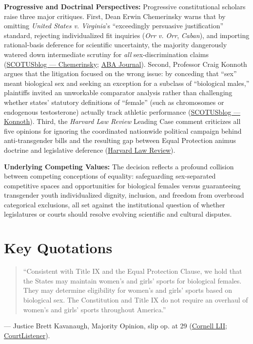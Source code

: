 \documentclass[12pt]{article}
\begin{document}
\textbf{Progressive and Doctrinal Perspectives:} Progressive constitutional scholars raise three major critiques. First, Dean Erwin Chemerinsky warns that by omitting \textit{United States v. Virginia}'s ``exceedingly persuasive justification'' standard, rejecting individualized fit inquiries (\textit{Orr v. Orr}, \textit{Caban}), and importing rational-basis deference for scientific uncertainty, the majority dangerously watered down intermediate scrutiny for \emph{all} sex-discrimination claims (\href{https://www.scotusblog.com/2026/08/weakening-the-protection-against-sex-discrimination/}{SCOTUSblog --- Chemerinsky}; \href{https://www.abajournal.com/columns/article/chemerinsky-how-supreme-courts-decisions-had-an-impact-on-democracy}{ABA Journal}). Second, Professor Craig Konnoth argues that the litigation focused on the wrong issue: by conceding that ``sex'' meant biological sex and seeking an exception for a subclass of ``biological males,'' plaintiffs invited an unworkable comparator analysis rather than challenging whether states' statutory definitions of ``female'' (such as chromosomes or endogenous testosterone) actually track athletic performance (\href{https://www.scotusblog.com/2026/07/why-the-supreme-court-decided-the-wrong-issue-in-the-transgender-athletes-cases/}{SCOTUSblog --- Konnoth}). Third, the \textit{Harvard Law Review} Leading Case comment criticizes all five opinions for ignoring the coordinated nationwide political campaign behind anti-transgender bills and the resulting gap between Equal Protection animus doctrine and legislative deference (\href{https://harvardlawreview.org/print/vol-140/west-virginia-v-b-p-j-ex-rel-jackson/}{Harvard Law Review}).

\textbf{Underlying Competing Values:} The decision reflects a profound collision between competing conceptions of equality: safeguarding sex-separated competitive spaces and opportunities for biological females versus guaranteeing transgender youth individualized dignity, inclusion, and freedom from overbroad categorical exclusions, all set against the institutional question of whether legislatures or courts should resolve evolving scientific and cultural disputes.

\section{Key Quotations}

\begin{quote}
``Consistent with Title IX and the Equal Protection Clause, we hold that the States may maintain women's and girls' sports for biological females. They may determine eligibility for women's and girls' sports based on biological sex. The Constitution and Title IX do not require an overhaul of women's and girls' sports throughout America.''
\end{quote}
\noindent --- Justice Brett Kavanaugh, Majority Opinion, slip op. at 29 (\href{https://www.law.cornell.edu/supremecourt/text/24-43}{Cornell LII}; \href{https://www.courtlistener.com/opinion/10882186/west-virginia-v-b-p-j/}{CourtListener}).
\end{document}
